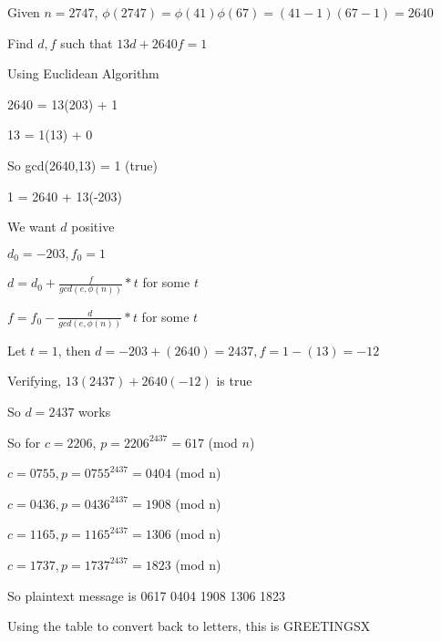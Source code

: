 \documentclass[12pt]{article}
\begin{document}
\begin{itemize}
  Given $n = 2747$, $\phi (2747) = \phi (41) \phi (67) = (41 - 1)(67 - 1) = 2640$

  Find $d,f$ such that $13d + 2640f = 1$

  Using Euclidean Algorithm

  2640 = 13(203) + 1

  13   = 1(13) + 0

  So gcd(2640,13) = 1 (true)

  1 = 2640 + 13(-203)

  We want $d$ positive

  $d_0 = -203, f_0 = 1$

  $d = d_0 + \frac{f}{gcd(e, \phi (n))}*t$ for some $t$

  $f = f_0 - \frac{d}{gcd(e, \phi (n))}*t$ for some $t$

  Let $t = 1$, then $d = -203 + (2640) = 2437, f = 1 - (13) = -12$

  Verifying, $13(2437) + 2640(-12)$ is true

  So $d = 2437$ works

  So for $c = 2206$, $p = 2206^{2437} = 617$ (mod $n$)

  $c = 0755, p = 0755^{2437} = 0404$ (mod n)

  $c = 0436, p = 0436^{2437} = 1908$ (mod n)

  $c = 1165, p = 1165^{2437} = 1306$ (mod n)

  $c = 1737, p = 1737^{2437} = 1823$ (mod n)

  So plaintext message is 0617 0404 1908 1306 1823

  Using the table to convert back to letters, this is GREETINGSX


\end{itemize}
\end{document}
